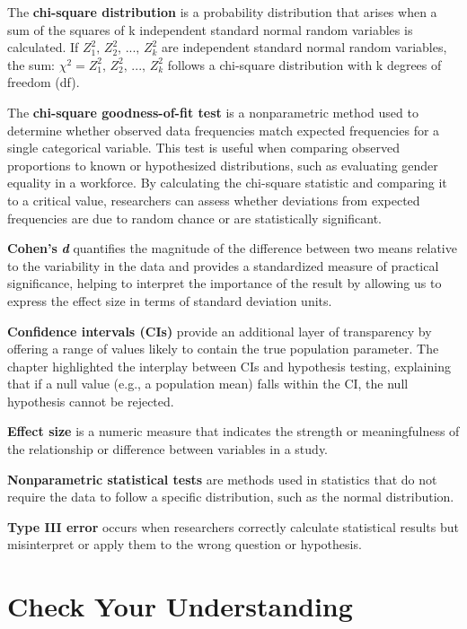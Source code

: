 \documentclass[
  letterpaper,
  DIV=11,
  numbers=noendperiod]{scrreprt}
\begin{document}
The \textbf{chi-square distribution} is a probability distribution that
arises when a sum of the squares of k independent standard normal random
variables is calculated. If \(Z_1^2, \, Z_2^2, \, ..., \, Z_k^2\) are
independent standard normal random variables, the sum:
\(\chi^2 = Z_1^2, \, Z_2^2, \, ..., \, Z_k^2\) follows a chi-square
distribution with k degrees of freedom (df).

The \textbf{chi-square goodness-of-fit test} is a nonparametric method
used to determine whether observed data frequencies match expected
frequencies for a single categorical variable. This test is useful when
comparing observed proportions to known or hypothesized distributions,
such as evaluating gender equality in a workforce. By calculating the
chi-square statistic and comparing it to a critical value, researchers
can assess whether deviations from expected frequencies are due to
random chance or are statistically significant.

\textbf{Cohen's} \textbf{\emph{d}} quantifies the magnitude of the
difference between two means relative to the variability in the data and
provides a standardized measure of practical significance, helping to
interpret the importance of the result by allowing us to express the
effect size in terms of standard deviation units.

\textbf{Confidence intervals (CIs)} provide an additional layer of
transparency by offering a range of values likely to contain the true
population parameter. The chapter highlighted the interplay between CIs
and hypothesis testing, explaining that if a null value (e.g., a
population mean) falls within the CI, the null hypothesis cannot be
rejected.

\textbf{Effect size} is a numeric measure that indicates the strength or
meaningfulness of the relationship or difference between variables in a
study.

\textbf{Nonparametric statistical tests} are methods used in statistics
that do not require the data to follow a specific distribution, such as
the normal distribution.

\textbf{Type III error} occurs when researchers correctly calculate
statistical results but misinterpret or apply them to the wrong question
or hypothesis.

\section*{Check Your Understanding}\label{check-your-understanding-7}
\end{document}
